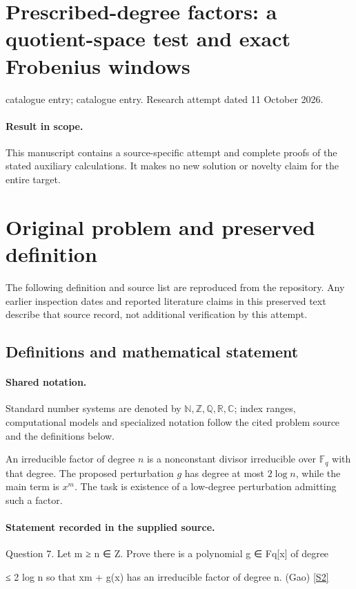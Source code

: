 \documentclass[11pt]{article}
\begin{document}
\section*{Prescribed-degree factors: a quotient-space test and exact Frobenius windows}
\noindent catalogue entry; catalogue entry. Research attempt dated 11 October 2026.
\paragraph{Result in scope.}This manuscript contains a source-specific attempt and complete proofs of the stated auxiliary calculations. It makes no new solution or novelty claim for the entire target.
\section{Original problem and preserved definition}
The following definition and source list are reproduced from the repository. Any earlier inspection dates and reported literature claims in this preserved text describe that source record, not additional verification by this attempt.
\subsection{Definitions and mathematical statement}

\paragraph{Shared notation.}Standard number systems are denoted by $\mathbb N,\mathbb Z,\mathbb Q,\mathbb R,\mathbb C$; index ranges, computational models and specialized notation follow the cited problem source and the definitions below.


An irreducible factor of degree $n$ is a nonconstant divisor irreducible over $\mathbb F_q$ with that degree. The proposed perturbation $g$ has degree at most $2\log n$, while the main term is $x^m$. The task is existence of a low-degree perturbation admitting such a factor.
\paragraph{Statement recorded in the supplied source.}
Question 7. Let m ≥ n ∈ Z. Prove there is a polynomial g ∈ Fq[x] of degree

≤ 2 log n so that xm + g(x) has an irreducible factor of degree n. (Gao) \href{https://aimath.org/WWN/primesinp/primesinp.pdf}{[S2]}
\end{document}
